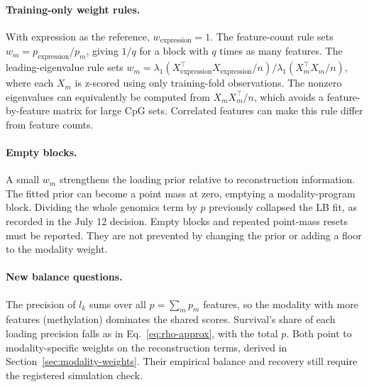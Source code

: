 \documentclass[11pt]{article}
\begin{document}
\paragraph{Training-only weight rules.} With expression as the reference,
$w_{\mathrm{expression}}=1$. The feature-count rule sets
$w_m=p_{\mathrm{expression}}/p_m$, giving $1/q$ for a block with $q$
times as many features. The leading-eigenvalue rule sets
$w_m=\lambda_1(X_{\mathrm{expression}}^\top
X_{\mathrm{expression}}/n)/\lambda_1(X_m^\top X_m/n)$,
where each $X_m$ is z-scored using only training-fold observations.
The nonzero eigenvalues can equivalently be computed from $X_mX_m^\top/n$,
which avoids a feature-by-feature matrix for large CpG sets.
Correlated features can make this rule differ from feature counts.

\paragraph{Empty blocks.} A small $w_m$ strengthens the loading prior
relative to reconstruction information. The fitted prior can become a
point mass at zero, emptying a modality-program block. Dividing the whole
genomics term by $p$ previously collapsed the LB fit, as recorded in the
July 12 decision. Empty blocks and repeated point-mass resets must be
reported. They are not prevented by changing the prior or adding a floor
to the modality weight.

\paragraph{New balance questions.} The precision of $l_k$ sums over all
$p = \sum_m p_m$ features, so the modality with more features (methylation)
dominates the shared scores. Survival's share of each loading precision falls
as in Eq.~\eqref{eq:rho-approx}, with the total $p$. Both point to
modality-specific weights on the reconstruction terms, derived in
Section~\ref{sec:modality-weights}. Their empirical balance and recovery
still require the registered simulation check.
\end{document}
